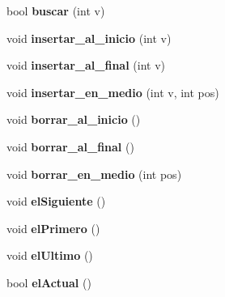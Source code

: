 \begin{DoxyCompactItemize}
\item 
\hypertarget{class_lista_a4f5e26c355ef8b85e8624f03e1613f03}{bool {\bfseries buscar} (int v)}\label{class_lista_a4f5e26c355ef8b85e8624f03e1613f03}

\item 
\hypertarget{class_lista_a307fffc669c59dfae8b6fd4807a910bf}{void {\bfseries insertar\-\_\-al\-\_\-inicio} (int v)}\label{class_lista_a307fffc669c59dfae8b6fd4807a910bf}

\item 
\hypertarget{class_lista_a0340b9064a8382bacc5189b64f6c48b9}{void {\bfseries insertar\-\_\-al\-\_\-final} (int v)}\label{class_lista_a0340b9064a8382bacc5189b64f6c48b9}

\item 
\hypertarget{class_lista_a27116b0e22b1d61f3891764ba1b1fbf7}{void {\bfseries insertar\-\_\-en\-\_\-medio} (int v, int pos)}\label{class_lista_a27116b0e22b1d61f3891764ba1b1fbf7}

\item 
\hypertarget{class_lista_a43cf60069118738e924e012ddd485b28}{void {\bfseries borrar\-\_\-al\-\_\-inicio} ()}\label{class_lista_a43cf60069118738e924e012ddd485b28}

\item 
\hypertarget{class_lista_aa7e0ffed070175f300f8113ecaad9f4c}{void {\bfseries borrar\-\_\-al\-\_\-final} ()}\label{class_lista_aa7e0ffed070175f300f8113ecaad9f4c}

\item 
\hypertarget{class_lista_afef42116222d4c29453c65de6100781a}{void {\bfseries borrar\-\_\-en\-\_\-medio} (int pos)}\label{class_lista_afef42116222d4c29453c65de6100781a}

\item 
\hypertarget{class_lista_a4daca26202f2c7c901f6752cc10cf452}{void {\bfseries el\-Siguiente} ()}\label{class_lista_a4daca26202f2c7c901f6752cc10cf452}

\item 
\hypertarget{class_lista_a16569b4589fb1e517b1ad54b3e55e131}{void {\bfseries el\-Primero} ()}\label{class_lista_a16569b4589fb1e517b1ad54b3e55e131}

\item 
\hypertarget{class_lista_aff9f248d9ea9f360a7a12ebe625ca3de}{void {\bfseries el\-Ultimo} ()}\label{class_lista_aff9f248d9ea9f360a7a12ebe625ca3de}

\item 
\hypertarget{class_lista_a9a21a25f0349a229885aa4163fe3d220}{bool {\bfseries el\-Actual} ()}\label{class_lista_a9a21a25f0349a229885aa4163fe3d220}


\end{DoxyCompactItemize}
